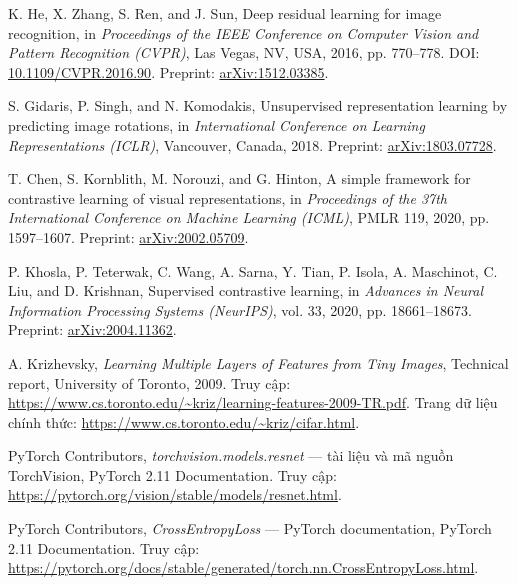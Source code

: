 K. He, X. Zhang, S. Ren, and J. Sun,
\newblock Deep residual learning for image recognition,
\newblock in \emph{Proceedings of the IEEE Conference on Computer Vision and
  Pattern Recognition (CVPR)}, Las Vegas, NV, USA, 2016, pp. 770--778.
\newblock DOI: \href{https://doi.org/10.1109/CVPR.2016.90}{10.1109/CVPR.2016.90}.
\newblock Preprint: \href{https://arxiv.org/abs/1512.03385}{arXiv:1512.03385}.

S. Gidaris, P. Singh, and N. Komodakis,
\newblock Unsupervised representation learning by predicting image rotations,
\newblock in \emph{International Conference on Learning Representations (ICLR)},
  Vancouver, Canada, 2018.
\newblock Preprint: \href{https://arxiv.org/abs/1803.07728}{arXiv:1803.07728}.

T. Chen, S. Kornblith, M. Norouzi, and G. Hinton,
\newblock A simple framework for contrastive learning of visual representations,
\newblock in \emph{Proceedings of the 37th International Conference on Machine
  Learning (ICML)}, PMLR 119, 2020, pp. 1597--1607.
\newblock Preprint: \href{https://arxiv.org/abs/2002.05709}{arXiv:2002.05709}.

P. Khosla, P. Teterwak, C. Wang, A. Sarna, Y. Tian, P. Isola, A. Maschinot,
C. Liu, and D. Krishnan,
\newblock Supervised contrastive learning,
\newblock in \emph{Advances in Neural Information Processing Systems (NeurIPS)},
  vol. 33, 2020, pp. 18661--18673.
\newblock Preprint: \href{https://arxiv.org/abs/2004.11362}{arXiv:2004.11362}.

A. Krizhevsky,
\newblock \emph{Learning Multiple Layers of Features from Tiny Images},
\newblock Technical report, University of Toronto, 2009.
\newblock Truy cập: \url{https://www.cs.toronto.edu/~kriz/learning-features-2009-TR.pdf}.
\newblock Trang dữ liệu chính thức: \url{https://www.cs.toronto.edu/~kriz/cifar.html}.

PyTorch Contributors,
\newblock \emph{torchvision.models.resnet} --- tài liệu và mã nguồn TorchVision,
\newblock PyTorch 2.11 Documentation.
\newblock Truy cập: \url{https://pytorch.org/vision/stable/models/resnet.html}.

PyTorch Contributors,
\newblock \emph{CrossEntropyLoss} --- PyTorch documentation,
\newblock PyTorch 2.11 Documentation.
\newblock Truy cập: \url{https://pytorch.org/docs/stable/generated/torch.nn.CrossEntropyLoss.html}.

